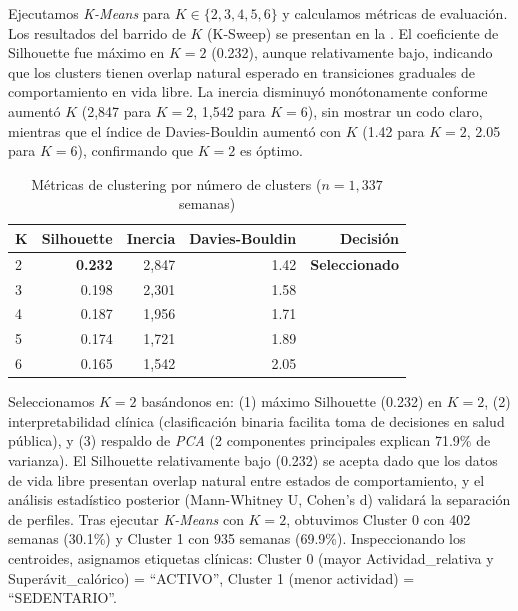 Ejecutamos \textit{K-Means} para $K \in \{2, 3, 4, 5, 6\}$ y calculamos métricas de evaluación. Los resultados del barrido de $K$ (K-Sweep) se presentan en la . El coeficiente de Silhouette fue máximo en $K=2$ (0.232), aunque relativamente bajo, indicando que los clusters tienen overlap natural esperado en transiciones graduales de comportamiento en vida libre. La inercia disminuyó monótonamente conforme aumentó $K$ (2,847 para $K=2$, 1,542 para $K=6$), sin mostrar un codo claro, mientras que el índice de Davies-Bouldin aumentó con $K$ (1.42 para $K=2$, 2.05 para $K=6$), confirmando que $K=2$ es óptimo.

\begin{table}[H]
    \centering
    \caption{Métricas de clustering por número de clusters ($n=1,337$ semanas)}
    \label{tab:k_sweep}
    \small
    \begin{tabular}{@{}lrrrr@{}}
        \toprule
        \textbf{K} & \textbf{Silhouette} & \textbf{Inercia} & \textbf{Davies-Bouldin} & \textbf{Decisión} \\
        \midrule
        2 & \textbf{0.232} & 2,847 & 1.42 & \textbf{Seleccionado} \\
        3 & 0.198       & 2,301 & 1.58 & \\
        4 & 0.187       & 1,956 & 1.71 & \\
        5 & 0.174       & 1,721 & 1.89 & \\
        6 & 0.165       & 1,542 & 2.05 & \\
        \bottomrule
    \end{tabular}
\end{table}

\FloatBarrier

Seleccionamos $K=2$ basándonos en: (1) máximo Silhouette (0.232) en $K=2$, (2) interpretabilidad clínica (clasificación binaria facilita toma de decisiones en salud pública), y (3) respaldo de \textit{PCA} (2 componentes principales explican 71.9\% de varianza). El Silhouette relativamente bajo (0.232) se acepta dado que los datos de vida libre presentan overlap natural entre estados de comportamiento, y el análisis estadístico posterior (Mann-Whitney U, Cohen's d) validará la separación de perfiles. Tras ejecutar \textit{K-Means} con $K=2$, obtuvimos Cluster 0 con 402 semanas (30.1\%) y Cluster 1 con 935 semanas (69.9\%). Inspeccionando los centroides, asignamos etiquetas clínicas: Cluster 0 (mayor Actividad\_relativa y Superávit\_calórico) = ``ACTIVO'', Cluster 1 (menor actividad) = ``SEDENTARIO''.

